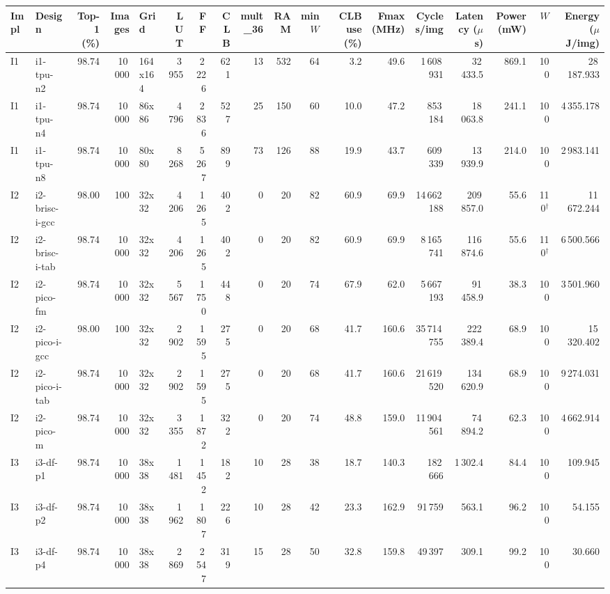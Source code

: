 \begin{table}[t]
\centering
\small
\begin{tabular}{llrrlrrrrrrrrrrrrr}
\toprule
Impl & Design & Top-1 (\%) & Images & Grid & LUT & FF & CLB & mult\_36 & RAM & min $W$ & CLB use (\%) & Fmax (MHz) & Cycles/img & Latency ($\mu$s) & Power (mW) & $W$ & Energy ($\mu$J/img) \\
\midrule
I1 & i1-tpu-n2 & 98.74 & 10\,000 & 164x164 & 3\,955 & 2\,226 & 621 & 13 & 532 & 64 & 3.2 & 49.6 & 1\,608\,931 & 32\,433.5 & 869.1 & 100 & 28\,187.933 \\
I1 & i1-tpu-n4 & 98.74 & 10\,000 & 86x86 & 4\,796 & 2\,836 & 527 & 25 & 150 & 60 & 10.0 & 47.2 & 853\,184 & 18\,063.8 & 241.1 & 100 & 4\,355.178 \\
I1 & i1-tpu-n8 & 98.74 & 10\,000 & 80x80 & 8\,268 & 5\,267 & 899 & 73 & 126 & 88 & 19.9 & 43.7 & 609\,339 & 13\,939.9 & 214.0 & 100 & 2\,983.141 \\
\midrule
I2 & i2-brisc-i-gcc & 98.00 & 100 & 32x32 & 4\,206 & 1\,265 & 402 & 0 & 20 & 82 & 60.9 & 69.9 & 14\,662\,188 & 209\,857.0 & 55.6 & 110$^\dagger$ & 11\,672.244 \\
I2 & i2-brisc-i-tab & 98.74 & 10\,000 & 32x32 & 4\,206 & 1\,265 & 402 & 0 & 20 & 82 & 60.9 & 69.9 & 8\,165\,741 & 116\,874.6 & 55.6 & 110$^\dagger$ & 6\,500.566 \\
I2 & i2-pico-fm & 98.74 & 10\,000 & 32x32 & 5\,567 & 1\,750 & 448 & 0 & 20 & 74 & 67.9 & 62.0 & 5\,667\,193 & 91\,458.9 & 38.3 & 100 & 3\,501.960 \\
I2 & i2-pico-i-gcc & 98.00 & 100 & 32x32 & 2\,902 & 1\,595 & 275 & 0 & 20 & 68 & 41.7 & 160.6 & 35\,714\,755 & 222\,389.4 & 68.9 & 100 & 15\,320.402 \\
I2 & i2-pico-i-tab & 98.74 & 10\,000 & 32x32 & 2\,902 & 1\,595 & 275 & 0 & 20 & 68 & 41.7 & 160.6 & 21\,619\,520 & 134\,620.9 & 68.9 & 100 & 9\,274.031 \\
I2 & i2-pico-m & 98.74 & 10\,000 & 32x32 & 3\,355 & 1\,872 & 322 & 0 & 20 & 74 & 48.8 & 159.0 & 11\,904\,561 & 74\,894.2 & 62.3 & 100 & 4\,662.914 \\
\midrule
I3 & i3-df-p1 & 98.74 & 10\,000 & 38x38 & 1\,481 & 1\,452 & 182 & 10 & 28 & 38 & 18.7 & 140.3 & 182\,666 & 1\,302.4 & 84.4 & 100 & 109.945 \\
I3 & i3-df-p2 & 98.74 & 10\,000 & 38x38 & 1\,962 & 1\,807 & 226 & 10 & 28 & 42 & 23.3 & 162.9 & 91\,759 & 563.1 & 96.2 & 100 & 54.155 \\
I3 & i3-df-p4 & 98.74 & 10\,000 & 38x38 & 2\,869 & 2\,547 & 319 & 15 & 28 & 50 & 32.8 & 159.8 & 49\,397 & 309.1 & 99.2 & 100 & 30.660 \\

\end{tabular}
\end{table}
